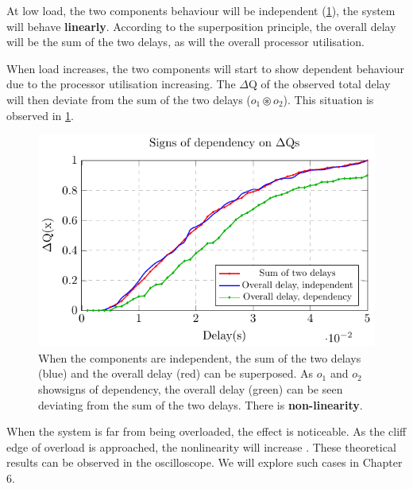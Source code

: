         At low load, the two components behaviour will be independent (\cref{fig:cdf_indep}), the system will behave \textbf{linearly}. According to the superposition principle, the overall delay will be the sum of the two delays, as will the overall processor utilisation. \cite{sup-p}
        
        When load increases, the two components will start to show dependent behaviour due to the processor utilisation increasing. The $\Delta$Q of the observed total delay will then deviate from the sum of the two delays ($o_1 \circledast o_2$). This situation is observed in \cref{fig:cdf_indep}.
        
        \begin{figure}[H]
            \begin{center}
                \includegraphics[scale=1]{tikz/cdf_indep.pdf}
            \end{center}
            \caption{When the components are independent, the sum of the two delays (blue) and the overall delay (red) can be superposed. As $o_1$ and $o_2$ showsigns of dependency, the overall delay (green) can be seen deviating from the sum of the two delays. There is \textbf{non-linearity}.}
            \label{fig:cdf_indep}%
        \end{figure}%

        When the system is far from being overloaded, the effect is noticeable. As the cliff edge of overload is approached, the nonlinearity will increase \cite{post} \cite{dq-tut}. These theoretical results can be observed in the oscilloscope. We will explore such cases in Chapter 6.
